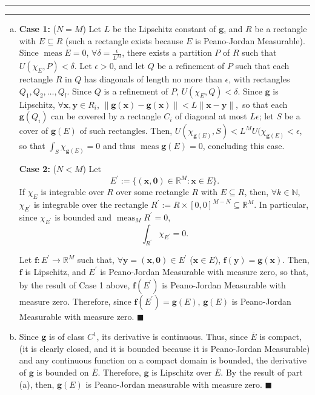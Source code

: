\documentclass[11pt]{article}
\newcounter{questionCounter}
\newcounter{partCounter}[questionCounter]
\newenvironment{question}[2][\arabic{questionCounter}]{%
    \setcounter{partCounter}{0}%
    \vspace{.25in} \hrule \vspace{0.5em}%
        \noindent{\bf #2}%
    \vspace{0.8em} \hrule \vspace{.10in}%
    \addtocounter{questionCounter}{1}%
}{}
\begin{document}
\begin{question}{Problem 4}
\begin{enumerate}[(a)]
\item {\bf Case 1:} ($N = M$) Let $L$ be the Lipschitz constant of
$\mathbf{g}$, and $R$ be a rectangle with $E \subseteq R$ (such a rectangle
exists because $E$ is Peano-Jordan Measurable). Since
$\operatorname{meas} E = 0$, $\forall \delta = \frac{\epsilon}{L^M}$, there exists a
partition $P$ of $R$ such that $U(\chi_E,P) < \delta$. Let $\epsilon > 0$, and
let $Q$ be a refinement of $P$ such that each rectangle $R$ in $Q$ has
diagonals of length no more than $\epsilon$, with rectangles
$Q_1,Q_2,\ldots,Q_l$. Since $Q$ is a refinement of $P$,
$U(\chi_E,Q) < \delta$. Since $\mathbf{g}$
is Lipschitz, $\forall \mathbf{x},\mathbf{y} \in R_i$,
$\|\mathbf{g}(\mathbf{x}) - \mathbf{g}(\mathbf{x})\|
                                              < L\|\mathbf{x} - \mathbf{y}\|,$
so that each $\mathbf{g}(Q_i)$ can be covered by a rectangle $C_i$ of diagonal
at most $L\epsilon$; let $S$ be a cover of $\mathbf{g}(E)$ of such rectangles.
Then, $U(\chi_{\mathbf{g}(E)},S) < L^MU(\chi_{\mathbf{g}(E)} < \epsilon$,
so that $\int_S \chi_{\mathbf{g}(E)} = 0$ and thus
$\operatorname{meas} \mathbf{g}(E) = 0$, concluding this case.

{\bf Case 2:} ($N < M$) Let \[E^{\prime}
         := \{(\mathbf{x},\mathbf{0}) \in \mathbb{R}^M : \mathbf{x} \in E\}.\]
If $\chi_E$ is integrable over $R$ over some rectangle $R$ with
$E \subseteq R$, then, $\forall k \in \mathbb{N}$, $\chi_{E^{\prime}}$ is
integrable over the rectangle
$R^{\prime} := R \times [0,0]^{M - N} \subseteq \mathbb{R}^M$.
In particular, since $\chi_{E^{\prime}}$ is bounded and
$\operatorname{meas}_{M} R^{\prime} = 0$, \[\int_{R^{\prime}} \chi_{E^{\prime}} = 0.\]

Let $\mathbf{f}: E^{\prime} \rightarrow \mathbb{R}^M$ such that,
$\forall \mathbf{y} = (\mathbf{x},\mathbf{0}) \in E^{\prime}$
($\mathbf{x} \in E$), $\mathbf{f}(\mathbf{y}) = \mathbf{g}(\mathbf{x})$. Then,
$\mathbf{f}$ is Lipschitz, and $E^{\prime}$ is Peano-Jordan Measurable with
measure zero, so that, by the result of Case 1 above, $\mathbf{f}(E^{\prime})$
is Peano-Jordan Measurable with measure zero. Therefore, since
$\mathbf{f}(E^{\prime}) = \mathbf{g}(E)$, $\mathbf{g}(E)$ is
Peano-Jordan Measurable with measure zero. \quad $\blacksquare$

\item Since $\mathbf{g}$ is of class $C^1$, its derivative is continuous.
Thus, since $\overline{E}$ is compact, (it is clearly closed, and it is
bounded because it is Peano-Jordan Measurable) and any continuous function on
a compact domain is bounded, the derivative of $\mathbf{g}$ is bounded on
$\overline{E}$. Therefore, $\mathbf{g}$ is Lipschitz over $\overline{E}$. By
the result of part (a), then, $\mathbf{g}(E)$ is Peano-Jordan measurable with
measure zero. \quad $\blacksquare$


\end{enumerate}
\end{question}
\end{document}
